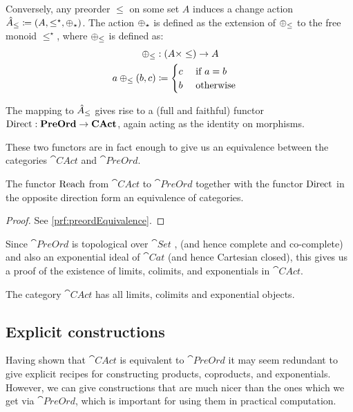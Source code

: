 Conversely, any preorder $\leq$ on some set $A$ induces a change action
$\hat{A}_\leq \coloneqq (A,\leq^\star,\oplus_\star)$.
The action $\oplus_\star$ is defined as the extension of $\oplus_\leq$ to the free
monoid $\leq^\star$, where $\oplus_\leq$ is defined as:
\[
\begin{aligned}
   \oplus_\leq &: (A \times \leq) \rightarrow A&\\
   a \oplus_\leq (b, c) &\coloneqq
     \begin{cases}
     c&\text{ if $a = b$}\\
     b&\text{ otherwise}
     \end{cases}
\end{aligned}
\]

The mapping to $\hat{A}_\leq$ gives rise to a (full and faithful) functor
$\operatorname{Direct} : \mathbf{PreOrd} \rightarrow \mathbf{CAct}$, again acting as the identity on morphisms.

These two functors are in fact enough to give us an equivalence between the categories
$\cat{CAct}$ and $\cat{PreOrd}$.

\begin{thm}[name=Equivalence of $\cat{CAct}$ and $\cat{PreOrd}$, restate=preordEquivalence]
  \label{thm:preordEquivalence}
  The functor $\operatorname{Reach}$ from $\cat{CAct}$ to $\cat{PreOrd}$ together with the
  functor $\operatorname{Direct}$ in the opposite direction form an equivalence of categories.
\end{thm}
\ifproofs
\begin{proof}
  See \cref{prf:preordEquivalence}.
\end{proof}
\fi

Since $\cat{PreOrd}$ is topological over $\cat{Set}$ \autocite[][Chapter V]{adamek2004abstract}, 
(and hence complete and co-complete) and also an exponential ideal of $\cat{Cat}$
(and hence Cartesian closed), this gives us a proof of the existence of limits, colimits, and exponentials in $\cat{CAct}$.

\begin{corollary}
  The category $\cat{CAct}$ has all limits, colimits and exponential objects.
\end{corollary}

\subsection{Explicit constructions}

Having shown that $\cat{CAct}$ is equivalent to $\cat{PreOrd}$ it may seem
redundant to give explicit recipes for constructing products, coproducts, and exponentials.
However, we can give constructions that are much nicer than the ones
which we get via $\cat{PreOrd}$, which is important for using them in
practical computation.

